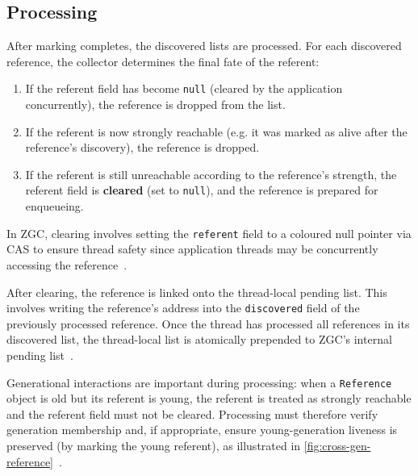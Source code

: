 \subsection{Processing}
\label{subsec:bg-refproc-processing}

After marking completes, the discovered lists are processed. For each discovered reference, the collector determines the final fate of the referent:

\begin{enumerate}
    \item If the referent field has become \texttt{null} (cleared by the application concurrently), the reference is dropped from the list.
    \item If the referent is now strongly reachable (e.g. it was marked as alive after the reference's discovery), the reference is dropped.
    \item If the referent is still unreachable according to the reference's strength, the referent field is \textbf{cleared} (set to \texttt{null}), and the reference is prepared for enqueueing.
\end{enumerate}

In \ac{ZGC}, clearing involves setting the \texttt{referent} field to a coloured null pointer via \ac{CAS} to ensure thread safety since application threads may be concurrently accessing the reference~\cite{openjdk-zbarrier-cpp,openjdk-zreferenceprocessor-cpp}.

After clearing, the reference is linked onto the thread-local pending list. This involves writing the reference's address into the \texttt{discovered} field of the previously processed reference. Once the thread has processed all references in its discovered list, the thread-local list is atomically prepended to \ac{ZGC}'s internal pending list~\cite{openjdk-zreferenceprocessor-cpp}.

Generational interactions are important during processing: when a \texttt{Reference} object is old but its referent is young, the referent is treated as strongly reachable and the referent field must not be cleared. Processing must therefore verify generation membership and, if appropriate, ensure young-generation liveness is preserved (by marking the young referent), as illustrated in \cref{fig:cross-gen-reference}~\cite{openjdk-zreferenceprocessor-cpp,openjdk-zgeneration-cpp}.

